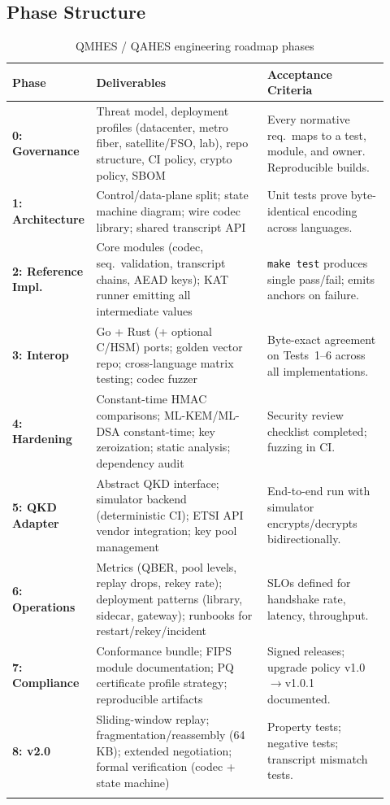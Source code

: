 \documentclass[12pt,letterpaper]{article}
\theoremstyle{plain}
\theoremstyle{definition}
\begin{document}
\subsection{Phase Structure}

\begin{longtable}{p{0.15\linewidth}p{0.45\linewidth}p{0.32\linewidth}}
\toprule
\textbf{Phase} & \textbf{Deliverables} & \textbf{Acceptance Criteria} \\
\midrule
\textbf{0: Governance} &
  Threat model, deployment profiles (datacenter, metro fiber, satellite/FSO,
  lab), repo structure, CI policy, crypto policy, SBOM &
  Every normative req.\ maps to a test, module, and owner.
  Reproducible builds. \\[4pt]
\textbf{1: Architecture} &
  Control/data-plane split; state machine diagram; wire codec library;
  shared transcript API &
  Unit tests prove byte-identical encoding across languages. \\[4pt]
\textbf{2: Reference Impl.} &
  Core modules (codec, seq.\ validation, transcript chains, AEAD keys);
  KAT runner emitting all intermediate values &
  \texttt{make test} produces single pass/fail; emits anchors on failure. \\[4pt]
\textbf{3: Interop} &
  Go + Rust (+ optional C/HSM) ports; golden vector repo;
  cross-language matrix testing; codec fuzzer &
  Byte-exact agreement on Tests~1--6 across all implementations. \\[4pt]
\textbf{4: Hardening} &
  Constant-time HMAC comparisons; ML-KEM/ML-DSA constant-time;
  key zeroization; static analysis; dependency audit &
  Security review checklist completed; fuzzing in CI. \\[4pt]
\textbf{5: QKD Adapter} &
  Abstract QKD interface; simulator backend (deterministic CI);
  ETSI API vendor integration; key pool management &
  End-to-end run with simulator encrypts/decrypts bidirectionally. \\[4pt]
\textbf{6: Operations} &
  Metrics (QBER, pool levels, replay drops, rekey rate);
  deployment patterns (library, sidecar, gateway);
  runbooks for restart/rekey/incident &
  SLOs defined for handshake rate, latency, throughput. \\[4pt]
\textbf{7: Compliance} &
  Conformance bundle; FIPS module documentation;
  PQ certificate profile strategy; reproducible artifacts &
  Signed releases; upgrade policy v1.0$\to$v1.0.1 documented. \\[4pt]
\textbf{8: v2.0} &
  Sliding-window replay; fragmentation/reassembly (64\,KB);
  extended negotiation; formal verification (codec + state machine) &
  Property tests; negative tests; transcript mismatch tests. \\
\bottomrule
\caption{QMHES / QAHES engineering roadmap phases}
\end{longtable}
\end{document}
